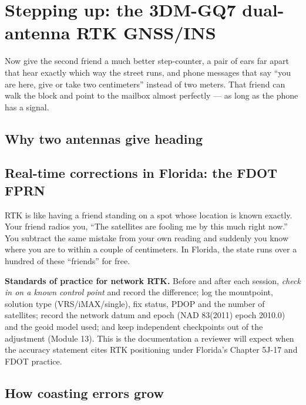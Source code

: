 \section{Stepping up: the 3DM-GQ7 dual-antenna RTK GNSS/INS}

\begin{kid}
Now give the second friend a much better step-counter, a pair of ears far apart that hear exactly which way the street runs, and phone messages that say ``you are here, give or take two centimeters'' instead of two meters. That friend can walk the block and point to the mailbox almost perfectly --- as long as the phone has a signal.
\end{kid}

\subsection*{Why two antennas give heading}


\subsection*{Real-time corrections in Florida: the FDOT FPRN}

\begin{kid}
RTK is like having a friend standing on a spot whose location is known exactly. Your friend radios you, ``The satellites are fooling me by this much right now.'' You subtract the same mistake from your own reading and suddenly you know where you are to within a couple of centimeters. In Florida, the state runs over a hundred of these ``friends'' for free.
\end{kid}

\begin{tip}
\textbf{Standards of practice for network RTK.} Before and after each session, \emph{check in on a known control point} and record the difference; log the mountpoint, solution type (VRS/iMAX/single), fix status, PDOP and the number of satellites; record the network datum and epoch (NAD 83(2011) epoch 2010.0) and the geoid model used; and keep independent checkpoints out of the adjustment (Module 13). This is the documentation a reviewer will expect when the accuracy statement cites RTK positioning under Florida's Chapter 5J-17 and FDOT practice.
\end{tip}

\subsection*{How coasting errors grow}

